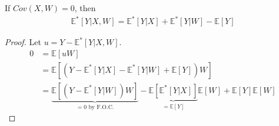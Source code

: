 \documentclass[11pt]{elegantbook}
\begin{document}
\begin{lemma}
    If $Cov(X,W)=0$, then
    \begin{equation}
        \begin{aligned}
            \mathbb{E}^*[Y|X,W]=\mathbb{E}^*[Y|X]+\mathbb{E}^*[Y|W]-\mathbb{E}[Y]
        \end{aligned}
        \nonumber
    \end{equation}
\end{lemma}
\begin{proof}
    Let $u=Y-\mathbb{E}^*[Y|X,W]$.
    \begin{equation}
        \begin{aligned}
            0&=\mathbb{E}[uW]\\
            &=\mathbb{E}[(Y-\mathbb{E}^*[Y|X]-\mathbb{E}^*[Y|W]+\mathbb{E}[Y])W]\\
            &=\underbrace{\mathbb{E}[(Y-\mathbb{E}^*[Y|W])W]}_{=0 \text{ by F.O.C.}}-\underbrace{\mathbb{E}[\mathbb{E}^*[Y|X]]}_{=\mathbb{E}[Y]}\mathbb{E}[W]+\mathbb{E}[Y]\mathbb{E}[W]
        \end{aligned}
        \nonumber
    \end{equation}
\end{proof}
\end{document}
